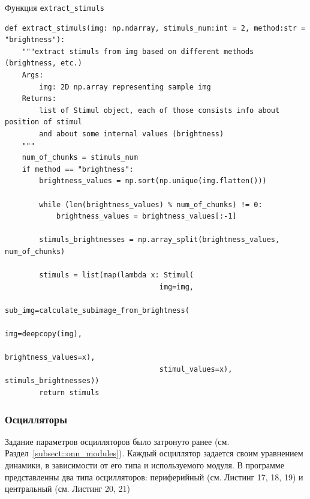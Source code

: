 \documentclass[14pt, russian]{scrartcl}
\begin{document}
\begin{listing}[!htt]
    \caption{Функция \texttt{extract\_stimuls}}
    \label{lst:contour_extr_sobel}
    \begin{verbatim}
def extract_stimuls(img: np.ndarray, stimuls_num:int = 2, method:str = "brightness"):
    """extract stimuls from img based on different methods (brightness, etc.)
    Args:
        img: 2D np.array representing sample img
    Returns:
        list of Stimul object, each of those consists info about position of stimul
        and about some internal values (brightness)
    """
    num_of_chunks = stimuls_num
    if method == "brightness":
        brightness_values = np.sort(np.unique(img.flatten()))

        while (len(brightness_values) % num_of_chunks) != 0:
            brightness_values = brightness_values[:-1]

        stimuls_brightnesses = np.array_split(brightness_values, num_of_chunks)
        
        stimuls = list(map(lambda x: Stimul(
                                    img=img, 
                                    sub_img=calculate_subimage_from_brightness(
                                                                    img=deepcopy(img),
                                                                    brightness_values=x),
                                    stimul_values=x), stimuls_brightnesses))
        return stimuls
    \end{verbatim}
\end{listing}

\subsubsection{Осцилляторы}

Задание параметров осцилляторов было затронуто ранее (см. Раздел~\ref{subsect::onn_modules}). Каждый осциллятор задается своим уравнением динамики, в зависимости 
от его типа и используемого модуля. В программе представленны два типа осцилляторов: периферийный (см. Листинг 17, 18, 19) и центральный (см. Листинг 20, 21)
\end{document}
